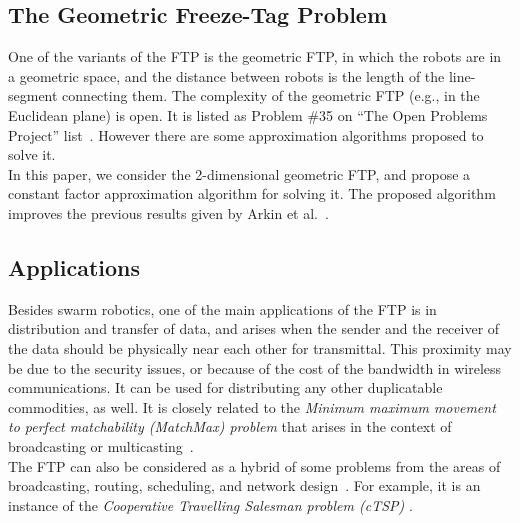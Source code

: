 \documentclass[review]{elsarticle}
\begin{document}
\subsection{The Geometric Freeze-Tag Problem}
One of the variants of the FTP is the geometric FTP, in which the robots are in a geometric space, and the distance between robots is the length of the line-segment connecting them.
The complexity of the geometric FTP (e.g., in the Euclidean plane) is open. It is listed as Problem \#35 on ``The Open Problems Project'' list~\cite{OpenProblems}. However there are some approximation algorithms proposed to solve it.\\
In this paper, we consider the 2-dimensional geometric FTP, and propose a constant factor approximation algorithm for solving it. The proposed algorithm improves the previous results given by Arkin et al.~\cite{Arkin2006}.

\subsection{Applications}
Besides swarm robotics, one of the main applications of the FTP is in distribution and transfer of data, and arises when the sender and the receiver of the data should be physically near each other for transmittal. This proximity may be due to the security issues, or because of the cost of the bandwidth in wireless communications. It can be used for distributing any other duplicatable commodities, as well.
It is closely related to the \textit{Minimum maximum movement to perfect matchability (MatchMax) problem} that arises in the context of broadcasting or multicasting~\cite{Demaine2009}.\\
The FTP can also be considered as a hybrid of some problems from the areas of broadcasting, routing, scheduling, and network design~\cite{Arkin2006}. For example, it is an instance of the \textit{Cooperative Travelling Salesman problem (cTSP)} \cite{Armon2010}.
\end{document}
